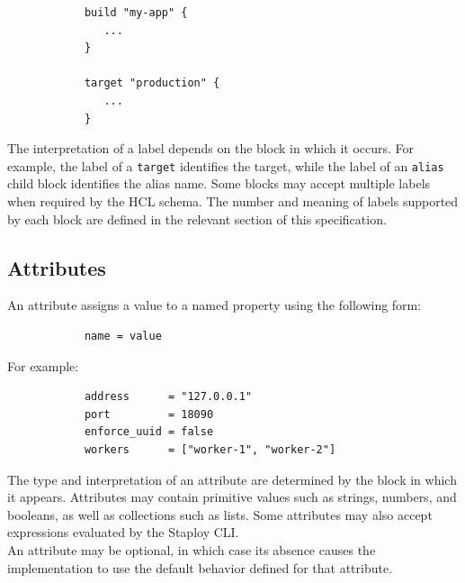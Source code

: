 \documentclass[11pt,a4paper]{article}
\begin{document}
    \begin{center}
        \begin{verbatim}
            build "my-app" {
               ...
            }

            target "production" {
               ...
            }
        \end{verbatim}
    \end{center}

    The interpretation of a label depends on the block in which it occurs.
    For example, the label of a \texttt{target} identifies the target, while
    the label of an \texttt{alias} child block identifies the alias name.
    Some blocks may accept multiple labels when required by the HCL schema.
    The number and meaning of labels supported by each block are defined in
    the relevant section of this specification.

    \subsection{Attributes}\label{subsec:attributes}

    An attribute assigns a value to a named property using the following form:

    \begin{center}
        \begin{verbatim}
            name = value
        \end{verbatim}
    \end{center}

    For example:

    \begin{center}
        \begin{verbatim}
            address      = "127.0.0.1"
            port         = 18090
            enforce_uuid = false
            workers      = ["worker-1", "worker-2"]
        \end{verbatim}
    \end{center}

    The type and interpretation of an attribute are determined by the block in which it appears.
    Attributes may contain primitive values such as strings, numbers, and
    booleans, as well as collections such as lists.
    Some attributes may also accept expressions evaluated by the Staploy CLI.\\
    An attribute may be optional, in which case its absence causes the
    implementation to use the default behavior defined for that attribute.
\end{document}
